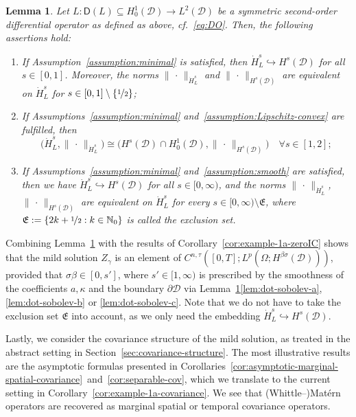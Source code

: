 \documentclass[reqno]{amsart}
\numberwithin{equation}{section}
\newcommand{\N}{\mathbb{N}}
\newcommand{\cD}{\mathcal{D}}
\newcommand{\from}{\colon}
\newtheorem{lemma}{Lemma}[section]
\theoremstyle{remark}
\theoremstyle{definition}
\begin{document}
\begin{lemma}\label{lem:dot-sobolev}
	Let $L\from\mathsf{D}(L) \subseteq H^1_0(\cD) \to L^2(\cD)$ 
	be a symmetric second-order 
	differential operator 
	as defined as above, cf.~\eqref{eq:DO}. 
	Then, the following assertions hold:
	\begin{enumerate}[label=(\alph*), leftmargin=1cm] 
		\item\label{lem:dot-sobolev-a}
		If Assumption~\textup{\ref{assumption:minimal}} is satisfied, 
		then $\dot H_L^s \hookrightarrow H^s(\cD)$ 
		for all ${s \in [0,1]}$. Moreover, 
		the norms $\| \,\cdot\, \|_{\dot H_L^s}$ 
		and 
		$\| \,\cdot\, \|_{H^s(\cD)}$ 
		are equivalent on 
		$\dot H_L^s$ for 
		$s \in [0,1]\setminus\{\nicefrac{1}{2}\}$; 
		\item\label{lem:dot-sobolev-b} 
		If Assumptions~\textup{\ref{assumption:minimal}} 
		and~\textup{\ref{assumption:Lipschitz-convex}} 
		are fulfilled, then
		\[ 
		\bigl( \dot H_L^s, \| \,\cdot\, \|_{\dot H_L^s} \bigr) 
		\cong 
		\bigl( 
		H^s(\cD) \cap H_0^1(\cD),
		\|\,\cdot\,\|_{H^s(\cD)} 
		\bigr) 
		\quad \forall s \in [1,2];
		\] 
		\item\label{lem:dot-sobolev-c} 
		If Assumptions~\textup{\ref{assumption:minimal}}  
		and~\textup{\ref{assumption:smooth}} are satisfied, 
		then we have $\dot H_L^s \hookrightarrow H^s(\cD)$ for all $s \in [0,\infty)$, 
		and the norms $\| \,\cdot\, \|_{\dot H_L^s}$, 
		$\|\,\cdot\,\|_{H^s(\cD)}$ 
		are equivalent on 
		$\dot H_L^s$ for every $s \in [0,\infty)\setminus \mathfrak{E}$, 
		where $\mathfrak{E} 
		:= 
		\{ 2k + \nicefrac{1}{2} : k \in \N_0 \}$ 
		is called the \emph{exclusion set}.
	\end{enumerate}
\end{lemma}

Combining Lemma~\ref{lem:dot-sobolev} 
with the results of 
Corollary~\ref{cor:example-1a-zeroIC} shows 
that the mild solution $Z_\gamma$ is an element of 
$C^{n,\tau}([0,T]; L^p(\Omega; H^{\beta\sigma}(\cD)))$, 
provided that $\sigma\beta\in[0,s']$, 
where $s'\in[1,\infty)$ is prescribed by the 
smoothness of the coefficients 
$a,\kappa$ 
and the boundary $\partial\cD$ 
via Lemma~\ref{lem:dot-sobolev}\ref{lem:dot-sobolev-a}, 
\ref{lem:dot-sobolev-b} or \ref{lem:dot-sobolev-c}. 
Note that we do not have to take the exclusion set
$\mathfrak{E}$ into account, 
as we only need the embedding 
$\dot H_L^s \hookrightarrow H^s(\cD)$.

Lastly, we consider the covariance structure 
of the mild solution,
as treated in the abstract setting 
in Section~\ref{sec:covariance-structure}.
The most illustrative results are the asymptotic formulas
presented in 
Corollaries~\ref{cor:asymptotic-marginal-spatial-covariance}~and~\ref{cor:separable-cov},
which we translate to the current setting in
Corollary~\ref{cor:example-1a-covariance}.
We see that
(Whittle--)Mat\'ern operators 
are recovered as marginal spatial 
or temporal covariance operators. 
\end{document}
